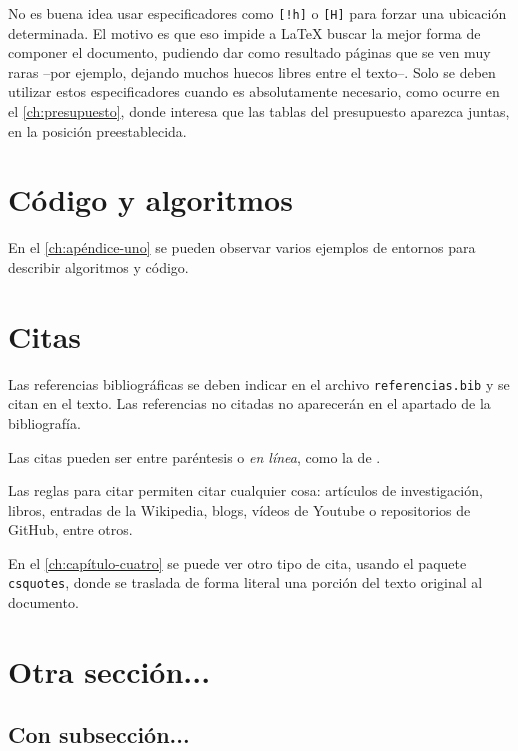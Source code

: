 No es buena idea usar especificadores como \verb|[!h]| o \verb|[H]| para forzar una ubicación determinada. El motivo es que eso impide a \LaTeX{} buscar la mejor forma de componer el documento, pudiendo dar como resultado páginas que se ven muy raras --por ejemplo, dejando muchos huecos libres entre el texto--.
Solo se deben utilizar estos especificadores cuando es absolutamente necesario, como ocurre en el \autoref{ch:presupuesto}, donde interesa que las tablas del presupuesto aparezca juntas, en la posición preestablecida.

\section{Código y algoritmos}

En el \autoref{ch:apéndice-uno} se pueden observar varios ejemplos de entornos para describir algoritmos y código.

\section{Citas}

Las referencias bibliográficas se deben indicar en el archivo \texttt{referencias.bib} y se citan en el texto. Las referencias no citadas no aparecerán en el apartado de la bibliografía.

Las citas pueden ser entre paréntesis \parencite{examplearticle} o \emph{en línea}, como la de \cite{examplegithub}.

Las  reglas para citar \parencite{ulllibguide} permiten citar cualquier cosa: artículos de investigación, libros, entradas de la Wikipedia, blogs, vídeos de Youtube o repositorios de GitHub, entre otros. 

En el \autoref{ch:capítulo-cuatro} se puede ver otro tipo de cita, usando el paquete \texttt{csquotes}, donde se traslada de forma literal una porción del texto original al documento.
 
\section{Otra sección...}

\lipsum[1]

\subsection{Con subsección...}

\lipsum[2]
